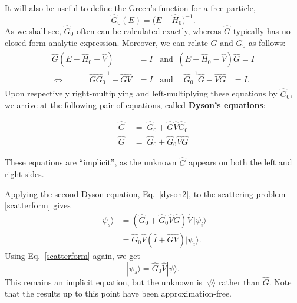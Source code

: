 \documentclass[prx,12pt]{revtex4-2}
\begin{document}
It will also be useful to define the Green's function for a free
particle,
\begin{equation}
  \hat{G}_0(E)=\big(E-\hat{H}_0\big)^{-1}.
  \label{G0unregulated}
\end{equation}
As we shall see, $\hat{G}_0$ often can be calculated exactly, whereas
$\hat{G}$ typically has no closed-form analytic expression.  Moreover,
we can relate $G$ and $G_0$ as follows:
\begin{align}
  \begin{aligned}
    \hat{G}(E-\hat{H}_0 - \hat{V})\;\; &= I \;\;\;\mathrm{and}\;\; (E-\hat{H}_0 - \hat{V})\hat{G} = I \\ \Leftrightarrow \quad\qquad \hat{G} \hat{G}_0^{-1} - \hat{G}\hat{V} &= I \;\;\; \mathrm{and}\;\;\;\;\, \hat{G}_0^{-1} \hat{G} - \hat{V}\hat{G} \;\;\;= I.
  \end{aligned}
\end{align}
Upon respectively right-multiplying and left-multiplying these equations
by $\hat{G}_0$, we arrive at the following pair of equations, called
\textbf{Dyson's equations}:
\begin{framed}
  \begin{align}
    \hat{G} \;&= \; \hat{G}_0 + \hat{G}\hat{V}\hat{G}_0 \\
    \hat{G} \;&=\; \hat{G}_0 + \hat{G}_0\hat{V}\hat{G} \label{dyson2}
  \end{align}
\end{framed}
\vskip-0.1in
\noindent
These equations are ``implicit'', as the unknown $\hat{G}$ appears on
both the left and right sides.

Applying the second Dyson equation, Eq.~\eqref{dyson2}, to the
scattering problem \eqref{scatterform} gives
\begin{align}
  |\psi_s\rangle
  &= \left(\hat{G}_0 + \hat{G}_0\hat{V}\hat{G}\right) \hat{V}
  \, |\psi_i\rangle \\
  &= \hat{G}_0 \hat{V} \left(\hat{I} + \hat{G} \hat{V}\right) |\psi_i\rangle.
  \label{psis_useful}
\end{align}
Using Eq.~\eqref{scatterform} again, we get
\begin{equation}
  |\psi_s\rangle = \hat{G}_0\hat{V} |\psi\rangle.
  \label{psis_implicity}
\end{equation}
This remains an implicit equation, but the unknown is $|\psi\rangle$
rather than $\hat{G}$.  Note that the results up to this point have
been approximation-free.
\end{document}

